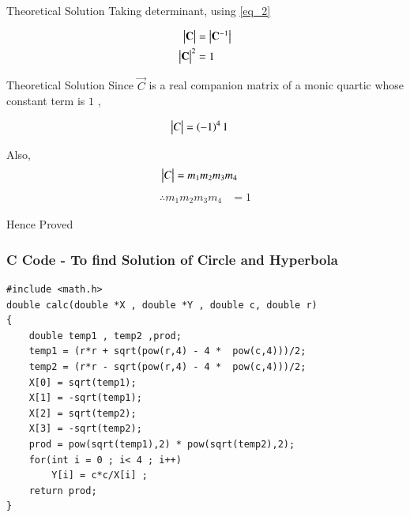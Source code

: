 \documentclass{beamer}
\begin{document}
\begin{frame}{Theoretical Solution}
Taking determinant, using \ref{eq_2}

\begin{align}
    \begin{vmatrix}\mathbf{C}\end{vmatrix} &= \begin{vmatrix}\mathbf{C}^{-1}\end{vmatrix}\\
    \begin{vmatrix}\mathbf{C}\end{vmatrix}^2 &= 1 
\end{align}
\end{frame}
\begin{frame}{Theoretical Solution}
Since $\vec{C}$ is a real companion matrix of a monic quartic whose constant term is $1$ , 

\begin{align}
    \begin{vmatrix}C\end{vmatrix} &= \left(-1\right)^4 1 
\end{align}

Also, 
\begin{align}
    \begin{vmatrix}C\end{vmatrix} &= m_1m_2m_3m_4
\end{align}
\begin{align}
    \therefore m_1m_2m_3m_4 &= 1 
\end{align}

Hence Proved
\end{frame}


\begin{frame}[fragile]
    \frametitle{C Code - To find Solution of Circle and Hyperbola }
    \begin{lstlisting}
#include <math.h>
double calc(double *X , double *Y , double c, double r)
{
    double temp1 , temp2 ,prod; 
    temp1 = (r*r + sqrt(pow(r,4) - 4 *  pow(c,4)))/2;
    temp2 = (r*r - sqrt(pow(r,4) - 4 *  pow(c,4)))/2; 
    X[0] = sqrt(temp1);
    X[1] = -sqrt(temp1);
    X[2] = sqrt(temp2);
    X[3] = -sqrt(temp2);
    prod = pow(sqrt(temp1),2) * pow(sqrt(temp2),2);
    for(int i = 0 ; i< 4 ; i++)
        Y[i] = c*c/X[i] ;
    return prod;
}


    \end{lstlisting}
\end{frame}
\end{document}
